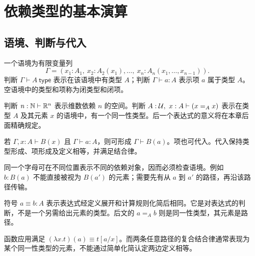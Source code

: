 \chapter{依赖类型的基本演算}
\section{语境、判断与代入}
\begin{definition}[语境与项]
一个语境为有限变量列
\[
\Gamma=(x_1:A_1,\ x_2:A_2(x_1),\ldots,\ x_n:A_n(x_1,\ldots,x_{n-1})).
\]
判断 $\Gamma\vdash A\ \mathsf{type}$ 表示在该语境中有类型 $A$；判断 $\Gamma\vdash a:A$ 表示项 $a$ 属于类型 $A$。空语境中的类型和项称为闭类型和闭项。
\end{definition}
\begin{example}
判断 $n:\mathbb N\vdash\mathbb R^n$ 表示维数依赖 $n$ 的空间。判断 $A:\mathcal U,\ x:A\vdash(x=_Ax)$ 表示在类型 $A$ 及其元素 $x$ 的语境中，有一个同一性类型。后一个表达式的意义将在本章后面精确规定。
\end{example}
\begin{definition}[代入规则]
若 $\Gamma,x:A\vdash B(x)$ 且 $\Gamma\vdash a:A$，则可形成 $\Gamma\vdash B(a)$。项也可代入。代入保持类型形成、项形成及定义相等，并满足结合律。
\end{definition}
\begin{remark}
同一个字母可在不同位置表示不同的依赖对象，因而必须检查语境。例如 $b:B(a)$ 不能直接被视为 $B(a')$ 的元素；需要先有从 $a$ 到 $a'$ 的路径，再沿该路径传输。
\end{remark}
\begin{definition}[定义相等]
符号 $a\equiv b:A$ 表示表达式经定义展开和计算规则化简后相同。它是对表达式的判断，不是一个另需给出元素的类型。后文的 $a=_Ab$ 则是同一性类型，其元素是路径。
\end{definition}
\begin{example}
函数应用满足 $(\lambda x.t)(a)\equiv t[a/x]$。而两条任意路径的复合结合律通常表现为某个同一性类型的元素，不能通过简单化简认定两边定义相等。
\end{example}

